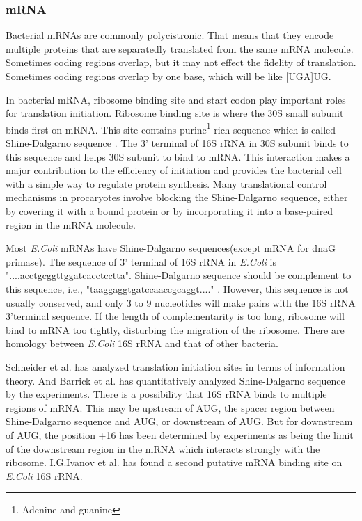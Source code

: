 \subsubsection{mRNA}
Bacterial mRNAs are commonly polycistronic. That means that they encode
multiple proteins that are separatedly translated from the same mRNA
molecule. Sometimes coding regions overlap, but it may not effect the
fidelity of
translation. Sometimes coding regions overlap by one base, which 
will be like [UG\underline{A]UG}.

In bacterial mRNA, ribosome binding site and start codon play important
roles for translation initiation. Ribosome binding site is where the 30S
small subunit binds first on mRNA. This site contains purine\footnote{Adenine
and guanine} rich sequence which is called Shine-Dalgarno sequence
\cite{label7}. The 3' terminal of 16S rRNA in 30S subunit binds
to this sequence and helps 30S subunit to bind to mRNA.
This interaction makes a major contribution to the efficiency of initiation
and provides the bacterial cell with a simple way to regulate protein
synthesis. Many translational control mechanisms in procaryotes involve 
blocking the Shine-Dalgarno sequence, either by covering it with a bound
protein or by incorporating it into a base-paired region in the mRNA
molecule. 

Most {\it E.Coli} mRNAs have Shine-Dalgarno sequences(except mRNA for dnaG
primase).
The sequence of 3' terminal of 16S rRNA in {\it E.Coli} is
"....acctgcggttggatcacctcctta". Shine-Dalgarno sequence should be
complement to this sequence, i.e., "taaggaggtgatccaaccgcaggt...." .
However, this sequence is not usually conserved, and only 3 to 9
nucleotides will make pairs with the 16S rRNA 3'terminal sequence.
If the length of complementarity is too long, ribosome will bind
to mRNA too tightly, disturbing the migration of the ribosome.
There are homology between {\it E.Coli} 16S rRNA and that of other bacteria.

Schneider et al. has analyzed translation initiation sites
in terms of information
theory\cite{label11}. And Barrick et al. has quantitatively analyzed 
Shine-Dalgarno sequence by the experiments\cite{label28}.
There is a possibility that 16S rRNA binds to
multiple regions of mRNA. This may be upstream of AUG, the spacer region 
between Shine-Dalgarno sequence and AUG, or downstream of AUG\cite{label10}.
But for downstream of AUG, the position +16 has been determined by experiments
as being the limit of the downstream region in the mRNA which interacts 
strongly with the ribosome.
I.G.Ivanov et al. has found a second putative
mRNA binding site on {\it E.Coli} 16S rRNA\cite{label23}.


